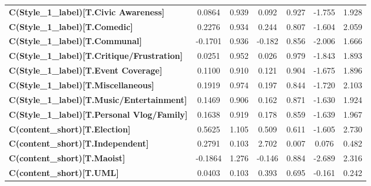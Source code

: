 \begin{center}
\begin{tabular}{lcccccc}
\textbf{C(Style\_1\_label)[T.Civic Awareness]}                                       &       0.0864  &        0.939     &     0.092  &         0.927        &       -1.755    &        1.928     \\
\textbf{C(Style\_1\_label)[T.Comedic]}                                               &       0.2276  &        0.934     &     0.244  &         0.807        &       -1.604    &        2.059     \\
\textbf{C(Style\_1\_label)[T.Communal]}                                              &      -0.1701  &        0.936     &    -0.182  &         0.856        &       -2.006    &        1.666     \\
\textbf{C(Style\_1\_label)[T.Critique/Frustration]}                                  &       0.0251  &        0.952     &     0.026  &         0.979        &       -1.843    &        1.893     \\
\textbf{C(Style\_1\_label)[T.Event Coverage]}                                        &       0.1100  &        0.910     &     0.121  &         0.904        &       -1.675    &        1.896     \\
\textbf{C(Style\_1\_label)[T.Miscellaneous]}                                         &       0.1919  &        0.974     &     0.197  &         0.844        &       -1.720    &        2.103     \\
\textbf{C(Style\_1\_label)[T.Music/Entertainment]}                                   &       0.1469  &        0.906     &     0.162  &         0.871        &       -1.630    &        1.924     \\
\textbf{C(Style\_1\_label)[T.Personal Vlog/Family]}                                  &       0.1638  &        0.919     &     0.178  &         0.859        &       -1.639    &        1.967     \\
\textbf{C(content\_short)[T.Election]}                                               &       0.5625  &        1.105     &     0.509  &         0.611        &       -1.605    &        2.730     \\
\textbf{C(content\_short)[T.Independent]}                                            &       0.2791  &        0.103     &     2.702  &         0.007        &        0.076    &        0.482     \\
\textbf{C(content\_short)[T.Maoist]}                                                 &      -0.1864  &        1.276     &    -0.146  &         0.884        &       -2.689    &        2.316     \\
\textbf{C(content\_short)[T.UML]}                                                    &       0.0403  &        0.103     &     0.393  &         0.695        &       -0.161    &        0.242     \\

\end{tabular}
\end{center}

